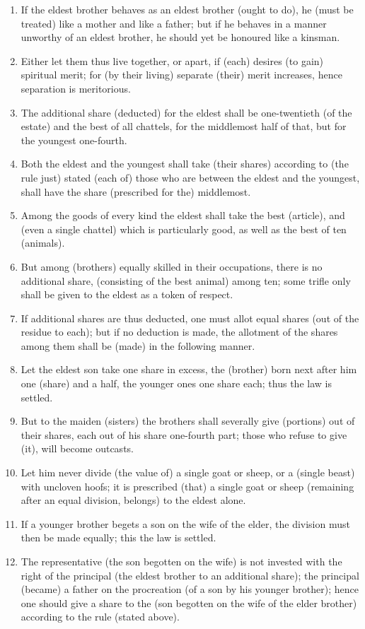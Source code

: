 \begin{enumerate}
\item If the eldest brother behaves as an eldest brother (ought to do), he (must be treated) like a mother and like a father; but if he behaves in a manner unworthy of an eldest brother, he should yet be honoured like a kinsman.
\item Either let them thus live together, or apart, if (each) desires (to gain) spiritual merit; for (by their living) separate (their) merit increases, hence separation is meritorious.
\item The additional share (deducted) for the eldest shall be one-twentieth (of the estate) and the best of all chattels, for the middlemost half of that, but for the youngest one-fourth.
\item Both the eldest and the youngest shall take (their shares) according to (the rule just) stated (each of) those who are between the eldest and the youngest, shall have the share (prescribed for the) middlemost.
\item Among the goods of every kind the eldest shall take the best (article), and (even a single chattel) which is particularly good, as well as the best of ten (animals).
\item But among (brothers) equally skilled in their occupations, there is no additional share, (consisting of the best animal) among ten; some trifle only shall be given to the eldest as a token of respect.
\item If additional shares are thus deducted, one must allot equal shares (out of the residue to each); but if no deduction is made, the allotment of the shares among them shall be (made) in the following manner.
\item Let the eldest son take one share in excess, the (brother) born next after him one (share) and a half, the younger ones one share each; thus the law is settled.
\item But to the maiden (sisters) the brothers shall severally give (portions) out of their shares, each out of his share one-fourth part; those who refuse to give (it), will become outcasts.
\item Let him never divide (the value of) a single goat or sheep, or a (single beast) with uncloven hoofs; it is prescribed (that) a single goat or sheep (remaining after an equal division, belongs) to the eldest alone.
\item If a younger brother begets a son on the wife of the elder, the division must then be made equally; this the law is settled.
\item The representative (the son begotten on the wife) is not invested with the right of the principal (the eldest brother to an additional share); the principal (became) a father on the procreation (of a son by his younger brother); hence one should give a share to the (son begotten on the wife of the elder brother) according to the rule (stated above).

\end{enumerate}
